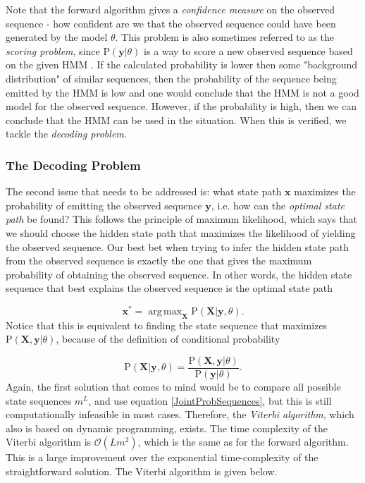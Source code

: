 \documentclass{article}\usepackage[]{graphicx}\usepackage[]{color}
\DeclareMathOperator*{\argmax}{arg\,max}
\begin{document}
Note that the forward algorithm gives a \textit{confidence measure} on the observed sequence - how confident are we that the observed sequence could have been generated by the model $\theta$. This problem is also sometimes referred to as the \textit{scoring problem}, since $\text{P}(\mathbf{y}|\theta)$ is a way to score a new observed sequence based on the given HMM \cite{Yoon2009}. If the calculated probability is lower then some "background distribution" of similar sequences, then the probability of the sequence being emitted by the HMM is low and one would conclude that the HMM is not a good model for the observed sequence. However, if the probability is high, then we can conclude that the HMM can be used in the situation. When this is verified, we tackle the \textit{decoding problem}.

\subsubsection{The Decoding Problem}
The second issue that needs to be addressed is: what state path $\mathbf{x}$ maximizes the probability of emitting the observed sequence $\mathbf{y}$, i.e. how can the \textit{optimal state path} be found? This follows the principle of maximum likelihood, which says that we should choose the hidden state path that maximizes the likelihood of yielding the observed sequence. Our best bet when trying to infer the hidden state path from the observed sequence is exactly the one that gives the maximum probability of obtaining the observed sequence. In other words, the hidden state sequence that best explains the observed sequence is the optimal state path

\begin{equation}
    \mathbf{x^*} = \argmax_\mathbf{X} \text{P}(\mathbf{X}|\mathbf{y}, \theta).
    \label{optimalStatePath}
\end{equation}
Notice that this is equivalent to finding the state sequence that maximizes $\text{P}(\mathbf{X}, \mathbf{y}|\theta)$, because of the definition of conditional probability  

\begin{equation*}
    \text{P}(\mathbf{X}|\mathbf{y}, \theta) = \frac{\text{P}(\mathbf{X}, \mathbf{y}|\theta)}{\text{P}(\mathbf{y}|\theta)}.
\end{equation*}
Again, the first solution that comes to mind would be to compare all possible state sequences $m^L$, and use equation \eqref{JointProbSequences}, but this is still computationally infeasible in most cases. Therefore, the \textit{Viterbi algorithm}, which also is based on dynamic programming, exists. The time complexity of the Viterbi algorithm is $\mathcal{O}(Lm^2)$, which is the same as for the forward algorithm. This is a large improvement over the exponential time-complexity of the straightforward solution. The Viterbi algorithm is given below. 
\end{document}
